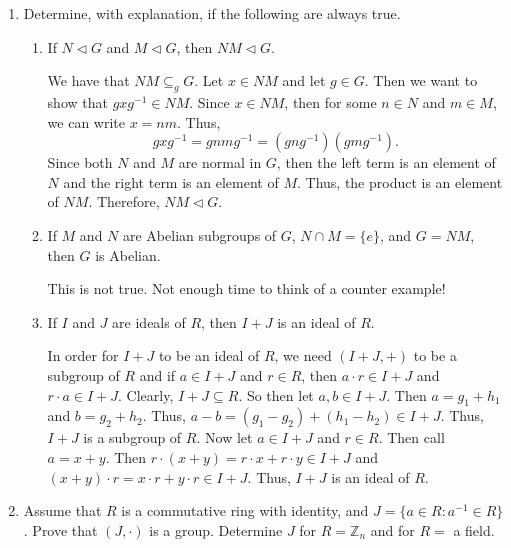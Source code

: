 \documentclass{article}
\makeatletter
\theoremstyle{definition}
\theoremstyle{remark}
\let\oldproofname=\proofname
\renewcommand{\proofname}{\bf{\textit{\oldproofname}}}
\theoremstyle{definition}
\renewenvironment{proof*}[1][\proofname]{\par
  \pushQED{\qed}%
  \normalfont \topsep6\p@\@plus6\p@\relax
  \list{}{\leftmargin=0mm
          \rightmargin=0mm
          \settowidth{\itemindent}{\itshape#1}%
          \labelwidth=\itemindent
          \parsep=0pt \listparindent=0mm%
  }
  \item[\hskip\labelsep
        \itshape
    #1\@addpunct{.}]\ignorespaces
}{%
  \popQED\endlist\@endpefalse
}
\makeatother
\begin{document}
\begin{enumerate}[leftmargin=*]
\begin{proof*}
            \end{proof*}
        \item Determine, with explanation, if the following are always true. 
            \begin{enumerate}[label=(\alph*)]
                \item If $N\triangleleft G$ and $M\triangleleft G$, then $NM\triangleleft G$.
                    \begin{proof*}
                        We have that $NM\subseteq_g G$. Let $x\in NM$ and let $g\in G$. Then we want to show that $gxg^{-1}\in NM$. Since $x\in NM$, then for some $n\in N$ and $m\in M$, we can write $x=nm$. Thus,
                            \begin{equation*}
                                gxg^{-1}=gnmg^{-1}=(gng^{-1})(gmg^{-1}).
                            \end{equation*}
                        Since both $N$ and $M$ are normal in $G$, then the left term is an element of $N$ and the right term is an element of $M$. Thus, the product is an element of $NM$. Therefore, $NM\triangleleft G$.
                    \end{proof*}
    \newpage
                \item If $M$ and $N$ are Abelian subgroups of $G$, $N\cap M=\{e\}$, and $G=NM$, then $G$ is Abelian. 
                    \begin{proof*}
                        This is not true. Not enough time to think of a counter example!
                    \end{proof*}
                \item If $I$ and $J$ are ideals of $R$, then $I+J$ is an ideal of $R$.
                    \begin{proof*}
                        In order for $I+J$ to be an ideal of $R$, we need $(I+J,+)$ to be a subgroup of $R$ and if $a\in I+J$ and $r\in R$, then $a\cdot r\in I+J$ and $r\cdot a\in I+J$. Clearly, $I+J\subseteq R$. So then let $a,b\in I+J$. Then $a=g_1+h_1$ and $b=g_2+h_2$. Thus, $a-b=(g_1-g_2)+(h_1-h_2)\in I+J$. Thus, $I+J$ is a subgroup of $R$. Now let $a\in I+J$ and $r\in R$. Then call $a=x+y$. Then $r\cdot(x+y)=r\cdot x+r\cdot y\in I+J$ and $(x+y)\cdot r=x\cdot r+y\cdot r\in I+J$. Thus, $I+J$ is an ideal of $R$.
                    \end{proof*}
            \end{enumerate}
        \item Assume that $R$ is a commutative ring with identity, and $J=\{a\in R\colon a^{-1}\in R\}$. Prove that $(J,\cdot)$ is a group. Determine $J$ for $R=\mathbb{Z}_n$ and for $R=$ a field.

\end{enumerate}
\end{document}
